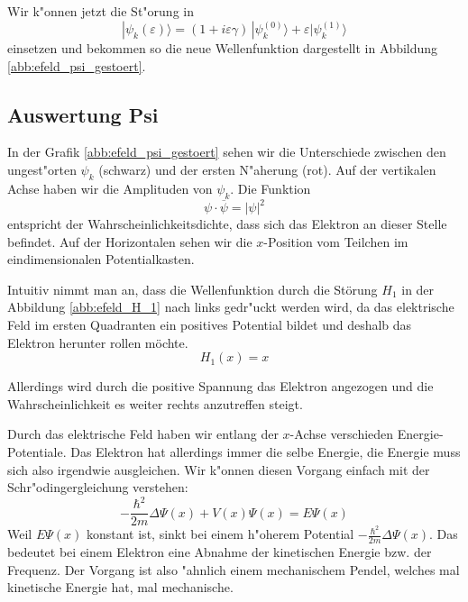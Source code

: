 \begin{refsection}
Wir k"onnen jetzt die St"orung in 
\begin{equation}
|\psi_k(\varepsilon)\rangle
=
(1+i\varepsilon \gamma)
\,|\psi_k^{(0)}\rangle
+
\varepsilon|\psi_k^{(1)}\rangle
\end{equation}
einsetzen und bekommen so die neue Wellenfunktion dargestellt in Abbildung \ref{abb:efeld_psi_gestoert}.




\subsection{Auswertung Psi}

In der Grafik \ref{abb:efeld_psi_gestoert} sehen wir die Unterschiede zwischen den ungest"orten 
$\psi_k$ (schwarz) und der ersten N"aherung (rot).
Auf der vertikalen Achse haben wir die Amplituden von $\psi_k$.
Die Funktion 
\[
  \psi \cdot \overline{\psi} = |\psi|^2
\]
entspricht der Wahrscheinlichkeitsdichte, 
dass sich das Elektron an dieser Stelle befindet.
Auf der Horizontalen sehen wir die $x$-Position vom Teilchen im eindimensionalen Potentialkasten.

Intuitiv nimmt man an, dass die Wellenfunktion durch die St\"orung $H_1$ in der Abbildung 
\ref{abb:efeld_H_1} nach links gedr"uckt werden wird, da das elektrische Feld 
im ersten Quadranten ein positives Potential bildet und deshalb das Elektron herunter rollen m\"ochte.
\[
  H_1(x) = x
\]

Allerdings wird durch die positive Spannung das Elektron angezogen und die
Wahrscheinlichkeit es weiter rechts anzutreffen steigt.

Durch das elektrische Feld haben wir entlang der $x$-Achse verschieden Energie-Potentiale.
Das Elektron hat allerdings immer die selbe Energie,
die Energie muss sich also irgendwie ausgleichen.
Wir k"onnen diesen Vorgang einfach mit der Schr"odingergleichung verstehen:
\[
-\frac{\hbar^2}{2m}\Delta\Psi(x) + V(x)\Psi(x)
=
E \Psi(x)
\]
Weil $E \Psi(x)$ konstant ist, sinkt bei einem h"oherem Potential $-\frac{\hbar^2}{2m}\Delta\Psi(x)$.
Das bedeutet bei einem Elektron eine Abnahme der kinetischen Energie bzw. der Frequenz.
Der Vorgang ist also "ahnlich einem mechanischem Pendel, 
welches mal kinetische Energie hat, mal mechanische.



\end{refsection}
